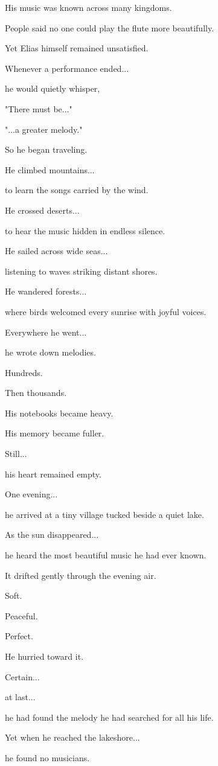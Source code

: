 \documentclass[12pt,openany]{book}
\begin{document}
His music was known across many kingdoms.

People said no one could play the flute more beautifully.

Yet Elias himself remained unsatisfied.

Whenever a performance ended...

he would quietly whisper,

"There must be..."

"...a greater melody."

So he began traveling.

He climbed mountains...

to learn the songs carried by the wind.

He crossed deserts...

to hear the music hidden in endless silence.

He sailed across wide seas...

listening to waves striking distant shores.

He wandered forests...

where birds welcomed every sunrise with joyful voices.

Everywhere he went...

he wrote down melodies.

Hundreds.

Then thousands.

His notebooks became heavy.

His memory became fuller.

Still...

his heart remained empty.

One evening...

he arrived at a tiny village tucked beside a quiet lake.

As the sun disappeared...

he heard the most beautiful music he had ever known.

It drifted gently through the evening air.

Soft.

Peaceful.

Perfect.

He hurried toward it.

Certain...

at last...

he had found the melody he had searched for all his life.

Yet when he reached the lakeshore...

he found no musicians.
\end{document}
